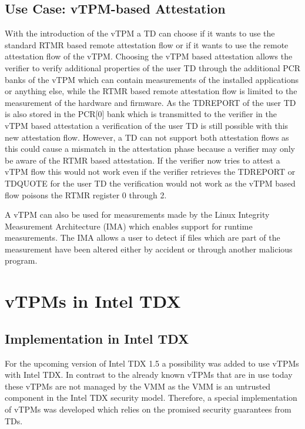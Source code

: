 \documentclass[sigplan,screen,nonacm]{acmart}
\begin{document}
\subsection{Use Case: vTPM-based Attestation}
With the introduction of the vTPM a TD can choose if it wants to use the standard RTMR based remote attestation flow or if it wants to use the remote attestation flow of the vTPM.
Choosing the vTPM based attestation allows the verifier to verify additional properties of the user TD through the additional PCR banks of the vTPM which can contain measurements of the installed applications or anything else, while the RTMR based remote attestation flow is limited to the measurement of the hardware and firmware.
As the TDREPORT of the user TD is also stored in the PCR[0] bank which is transmitted to the verifier in the vTPM based attestation a verification of the user TD is still possible with this new attestation flow.
However, a TD can not support both attestation flows as this could cause a mismatch in the attestation phase because a verifier may only be aware of the RTMR based attestation.
If the verifier now tries to attest a vTPM flow this would not work even if the verifier retrieves the TDREPORT or TDQUOTE for the user TD the verification would not work as the vTPM based flow poisons the RTMR register 0 through 2.

A vTPM can also be used for measurements made by the Linux Integrity Measurement Architecture (IMA) which enables support for runtime measurements\cite{Intel-IMA}.
The IMA allows a user to detect if files which are part of the measurement have been altered either by accident or through another malicious program.

\section{vTPMs in Intel TDX}
\label{chap:vTPMTDX}

\subsection{Implementation in Intel TDX}
For the upcoming version of Intel TDX 1.5 a possibility was added to use vTPMs with Intel TDX.
In contrast to the already known vTPMs that are in use today these vTPMs are not managed by the VMM as the VMM is an untrusted component in the Intel TDX security model.
Therefore, a special implementation of vTPMs was developed which relies on the promised security guarantees from TDs.
\end{document}
